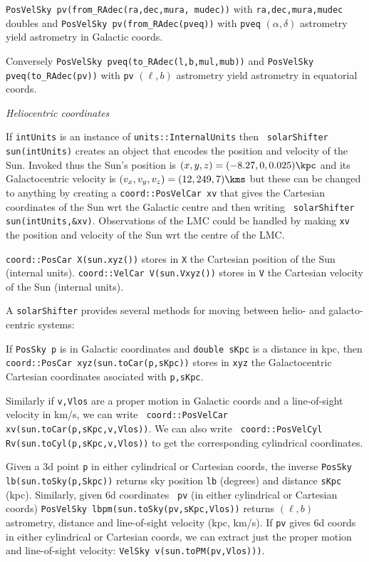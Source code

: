 \nwsec
{\tt PosVelSky pv(from\_RAdec(ra,dec,mura,
mudec))} with {\tt ra,dec,mura,mudec} doubles and
{\tt PosVelSky pv(from\_RAdec(pveq))} with {\tt pveq} $(\alpha,\delta)$
astrometry  yield astrometry in Galactic coords. 

\nwsec 
Conversely {\tt PosVelSky pveq(to\_RAdec(l,b,mul,mub))} and 
{\tt PosVelSky pveq(to\_RAdec(pv))} with {\tt pv} $(\ell,b)$ astrometry 
yield astrometry in equatorial coords. 

\bigskip
\centerline{\it Heliocentric coordinates}

\nwsec
If {\tt intUnits} is an instance of {\tt units::InternalUnits} then {\tt
solarShifter sun(intUnits)} creates an object that encodes the position
and velocity
of the Sun. Invoked thus the Sun's position is $(x,y,z)=(-8.27,0,0.025)\kpc$
and its
Galactocentric velocity is $(v_x,v_y,v_z)=(12,249,7)\kms$ but these can be
changed to anything by creating a {\tt coord::PosVelCar xv} that gives the Cartesian
coordinates of the Sun wrt the Galactic centre and then writing {\tt
solarShifter sun(intUnits,\&xv)}. Observations of the LMC
could be handled by making {\tt xv} the position and velocity of the Sun wrt
the centre of the LMC.

\nwsec
{\tt coord::PosCar X(sun.xyz())} stores in {\tt X} the Cartesian position of the
Sun (internal units). {\tt coord::VelCar V(sun.Vxyz())} stores in {\tt V} the
Cartesian velocity of the Sun (internal units). 

\nwsec
A {\tt solarShifter} provides several
methods for moving between helio- and galacto-centric systems:

\nwsec
If {\tt PosSky p} is in Galactic coordinates and {\tt double sKpc} is a
distance in kpc,
then {\tt coord::PosCar xyz(sun.toCar(p,sKpc))} stores in {\tt xyz}  the Galactocentric
Cartesian coordinates asociated with {\tt p,sKpc}. 

\nwsec
Similarly if {\tt v,Vlos} are a proper motion in Galactic coords and a
line-of-sight velocity in km/s, we can write {\tt
coord::PosVelCar xv(sun.toCar(p,sKpc,v,Vlos))}. We can also write
{\tt
coord::PosVelCyl Rv(sun.toCyl(p,sKpc,v,Vlos))} to get the corresponding cylindrical
coordinates. 

\nwsec
Given a 3d point {\tt p} in either cylindrical or Cartesian coords, the
inverse\hfil{} {\tt PosSky lb(sun.toSky(p,Skpc))} returns sky position {\tt lb}
(degrees) and distance {\tt sKpc} (kpc). Similarly, given 6d coordinates {\tt
pv} (in either cylindrical or Cartesian coords) {\tt PosVelSky
lbpm(sun.toSky(pv,sKpc,Vlos))} returns $(\ell,b)$ astrometry, distance and
line-of-sight velocity (kpc, km/s).  If {\tt pv} gives 6d coords in either
cylindrical or Cartesian coords, we can extract just the proper motion and
line-of-sight velocity: {\tt VelSky v(sun.toPM(pv,Vlos)))}.


